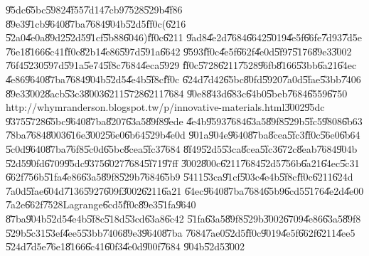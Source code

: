 \documentclass{article}
\begin{document}
\U{95dc}\U{65bc}\U{5982}\U{4f55}\U{7d14}\U{7cb9}\U{7528}\U{529b}\U{4f86}%
\U{89e3}\U{91cb}\U{9640}\U{87ba}\U{7684}\U{904b}\U{52d5}\U{ff0c}(\U{6216}%
\U{52a0}\U{4e0a}\U{89d2}\U{52d5}\U{91cf}\U{5b88}\U{6046})\U{ff0c}\U{6211}%
\U{9ad8}\U{4e2d}\U{7684}\U{6642}\U{5019}\U{4e5f}\U{66fe}\U{7d93}\U{7d5e}%
\U{76e1}\U{8166}\U{6c41}\U{ff0c}\U{82b1}\U{4e86}\U{597d}\U{591a}\U{6642}%
\U{9593}\U{ff0c}\U{4e5f}\U{662f}\U{4e0d}\U{5f97}\U{5176}\U{89e3}\U{3002}%
\U{76f4}\U{5230}\U{597d}\U{591a}\U{5e74}\U{5f8c}\U{7684}\U{4eca}\U{5929}%
\U{ff0c}\U{5728}\U{6211}\U{7528}\U{96fb}\U{8166}\U{53bb}\U{6a21}\U{64ec}%
\U{4e86}\U{9640}\U{87ba}\U{7684}\U{904b}\U{52d5}\U{4e4b}\U{5f8c}\U{ff0c}%
\U{624d}\U{7d42}\U{65bc}\U{80fd}\U{5920}\U{7a0d}\U{5fae}\U{53bb}\U{7406}%
\U{89e3}\U{3002}\U{8acb}\U{53c3}\U{8003}\U{6211}\U{5728}\U{6211}\U{7684}%
\U{90e8}\U{843d}\U{683c}\U{64b0}\U{5beb}\U{7684}\U{6559}\U{6750}%
http://whymranderson.blogspot.tw/p/innovative-materials.html\U{3002}\U{95dc}%
\U{9375}\U{5728}\U{65bc}\U{9640}\U{87ba}\U{8207}\U{63a5}\U{89f8}\U{9ede}%
\U{4e4b}\U{9593}\U{7684}\U{63a5}\U{89f8}\U{529b}\U{5fc5}\U{9808}\U{6b63}%
\U{78ba}\U{7684}\U{8003}\U{616e}\U{3002}\U{56e0}\U{6b64}\U{529b}\U{4e0d}%
\U{901a}\U{904e}\U{9640}\U{87ba}\U{8cea}\U{5fc3}\U{ff0c}\U{56e0}\U{6b64}%
\U{5c0d}\U{9640}\U{87ba}\U{76f8}\U{5c0d}\U{65bc}\U{8cea}\U{5fc3}\U{7684}%
\U{8f49}\U{52d5}\U{53ca}\U{8cea}\U{5fc3}\U{672c}\U{8eab}\U{7684}\U{904b}%
\U{52d5}\U{90fd}\U{6709}\U{95dc}\U{9375}\U{6027}\U{7684}\U{5f71}\U{97ff}%
\U{3002}\U{800c}\U{6211}\U{7684}\U{52d5}\U{756b}\U{6a21}\U{64ec}\U{5c31}%
\U{662f}\U{756b}\U{51fa}\U{4e86}\U{63a5}\U{89f8}\U{529b}\U{7684}\U{65b9}%
\U{5411}\U{53ca}\U{91cf}\U{503c}\U{4e4b}\U{5f8c}\U{ff0c}\U{6211}\U{624d}%
\U{7a0d}\U{5fae}\U{604d}\U{7136}\U{5927}\U{609f}\U{3002}\U{6211}\U{6a21}%
\U{64ec}\U{9640}\U{87ba}\U{7684}\U{65b9}\U{6cd5}\U{5176}\U{4e2d}\U{4e00}%
\U{7a2e}\U{662f}\U{7528}Lagrange\U{6cd5}\U{ff0c}\U{89e3}\U{51fa}\U{9640}%
\U{87ba}\U{904b}\U{52d5}\U{4e4b}\U{5f8c}\U{518d}\U{53cd}\U{63a8}\U{6c42}%
\U{51fa}\U{63a5}\U{89f8}\U{529b}\U{3002}\U{6709}\U{4e86}\U{63a5}\U{89f8}%
\U{529b}\U{5c31}\U{53ef}\U{4ee5}\U{53bb}\U{7406}\U{89e3}\U{9640}\U{87ba}%
\U{7684}\U{7ae0}\U{52d5}\U{ff0c}\U{9019}\U{4e5f}\U{662f}\U{6211}\U{4ee5}%
\U{524d}\U{7d5e}\U{76e1}\U{8166}\U{6c41}\U{60f3}\U{4e0d}\U{900f}\U{7684}%
\U{904b}\U{52d5}\U{3002}
\end{document}
